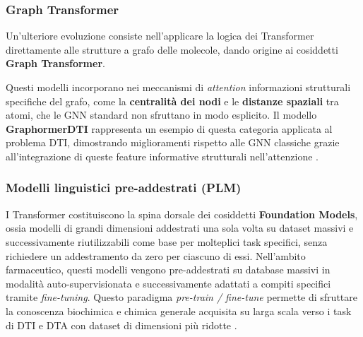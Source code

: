 \subsubsection{Graph Transformer}
Un'ulteriore evoluzione consiste nell'applicare la logica dei Transformer
direttamente alle strutture a grafo delle molecole, dando origine ai
cosiddetti \textbf{Graph Transformer}.

Questi modelli incorporano nei
meccanismi di \textit{attention} informazioni strutturali specifiche del grafo,
come la \textbf{centralità dei nodi} e le \textbf{distanze spaziali} tra
atomi, che le GNN standard non sfruttano in modo esplicito.
Il modello \textbf{GraphormerDTI} rappresenta un esempio di questa
categoria applicata al problema DTI, dimostrando miglioramenti rispetto
alle GNN classiche grazie all'integrazione di queste feature informative strutturali
nell'attenzione \cite{kumarPredictingDrugtargetInteractions2026a}.

\subsubsection{Modelli linguistici pre-addestrati (PLM)}
I Transformer costituiscono la spina dorsale dei cosiddetti
\textbf{Foundation Models}, ossia modelli di grandi dimensioni
addestrati una sola volta su dataset massivi e successivamente
riutilizzabili come base per molteplici task specifici, senza
richiedere un addestramento da zero per ciascuno di essi.
Nell'ambito farmaceutico, questi modelli vengono pre-addestrati su
database massivi in modalità auto-supervisionata e successivamente
adattati a compiti specifici tramite \textit{fine-tuning}. Questo
paradigma \textit{pre-train / fine-tune} permette di sfruttare la
conoscenza biochimica e chimica generale acquisita su larga scala
verso i task di DTI e DTA con dataset di dimensioni più ridotte
\cite{wangUnifiedSurveyDrugtarget2026a}.